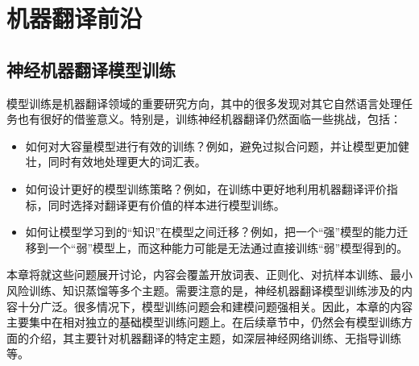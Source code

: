 
%

\part{机器翻译前沿}
\renewcommand\figurename{图}%
\renewcommand\tablename{表}%


\chapter{神经机器翻译模型训练}

\parinterval 模型训练是机器翻译领域的重要研究方向，其中的很多发现对其它自然语言处理任务也有很好的借鉴意义。特别是，训练神经机器翻译仍然面临一些挑战，包括：

\begin{itemize}
\vspace{0.5em}
\item 如何对大容量模型进行有效的训练？例如，避免过拟合问题，并让模型更加健壮，同时有效地处理更大的词汇表。
\vspace{0.5em}
\item 如何设计更好的模型训练策略？例如，在训练中更好地利用机器翻译评价指标，同时选择对翻译更有价值的样本进行模型训练。
\vspace{0.5em}
\item 如何让模型学习到的“知识”在模型之间迁移？例如，把一个“强”模型的能力迁移到一个“弱”模型上，而这种能力可能是无法通过直接训练“弱”模型得到的。
\vspace{0.5em}
\end{itemize}

\parinterval 本章将就这些问题展开讨论，内容会覆盖开放词表、正则化、对抗样本训练、最小风险训练、知识蒸馏等多个主题。需要注意的是，神经机器翻译模型训练涉及的内容十分广泛。很多情况下，模型训练问题会和建模问题强相关。因此，本章的内容主要集中在相对独立的基础模型训练问题上。在后续章节中，仍然会有模型训练方面的介绍，其主要针对机器翻译的特定主题，如深层神经网络训练、无指导训练等。

